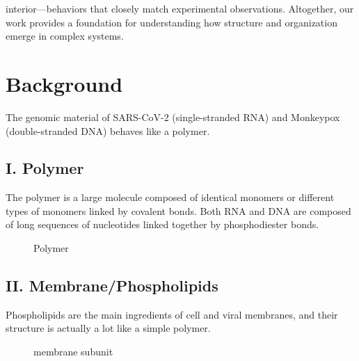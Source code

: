 \documentclass[12pt]{article}
\begin{document}
\begin{flushleft}
\noindent interior—behaviors that closely match experimental observations. Altogether, our work provides a foundation for understanding how structure and organization emerge in complex systems.


\section*{Background} 
The genomic material of SARS-CoV-2 (single-stranded RNA) and Monkeypox (double-stranded DNA) behaves like a polymer. 


\subsection*{I. Polymer}
The polymer is a large molecule composed of identical monomers or different types of monomers linked by covalent bonds\cite {Everaers2020}. Both RNA and DNA are composed of long sequences of nucleotides linked together by phosphodiester bonds. 

\begin{figure}[!ht]
  \centering
  
  \caption{Polymer}
\end{figure}



\subsection*{II. Membrane/Phospholipids}
Phospholipids are the main ingredients of cell and viral membranes, and their structure is actually a lot like a simple polymer. 

\begin{figure}[!ht]
  \centering
  \caption{membrane subunit}
\end{figure}




\end{flushleft}
\end{document}
